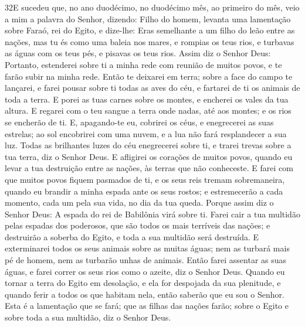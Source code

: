 \lettrine{32} E sucedeu que, no ano duodécimo, no duodécimo
mês, ao primeiro do mês, veio a mim a palavra do Senhor, dizendo:
Filho do homem, levanta uma lamentação sobre Faraó, rei do
Egito, e dize-lhe: Eras semelhante a um filho do leão entre as
nações, mas tu és como uma baleia nos mares, e rompias os teus rios,
e turbavas as águas com os teus pés, e pisavas os teus rios.
Assim diz o Senhor Deus: Portanto, estenderei sobre ti a minha
rede com reunião de muitos povos, e te farão subir na minha rede.
Então te deixarei em terra; sobre a face do campo te lançarei, e
farei pousar sobre ti todas as aves do céu, e fartarei de ti os
animais de toda a terra. E porei as tuas carnes sobre os montes,
e encherei os vales da tua altura. E regarei com o teu sangue a
terra onde nadas, até aos montes; e os rios se encherão de ti.
E, apagando-te eu, cobrirei os céus, e enegrecerei as suas
estrelas; ao sol encobrirei com uma nuvem, e a lua não fará
resplandecer a sua luz. Todas as brilhantes luzes do céu
enegrecerei sobre ti, e trarei trevas sobre a tua terra, diz o
Senhor Deus. E afligirei os corações de muitos povos, quando eu
levar a tua destruição entre as nações, às terras que não
conheceste. E farei com que muitos povos fiquem pasmados de
ti, e os seus reis tremam sobremaneira, quando eu brandir a minha
espada ante os seus rostos; e estremecerão a cada momento, cada um
pela sua vida, no dia da tua queda. Porque assim diz o Senhor
Deus: A espada do rei de Babilônia virá sobre ti. Farei cair
a tua multidão pelas espadas dos poderosos, que são todos os mais
terríveis das nações; e destruirão a soberba do Egito, e toda a sua
multidão será destruída. E exterminarei todos os seus animais
sobre as muitas águas; nem as turbará mais pé de homem, nem as
turbarão unhas de animais. Então farei assentar as suas
águas, e farei correr os seus rios como o azeite, diz o Senhor Deus.
Quando eu tornar a terra do Egito em desolação, e ela for
despojada da sua plenitude, e quando ferir a todos os que habitam
nela, então saberão que eu sou o Senhor. Esta é a lamentação
que se fará; que as filhas das nações farão; sobre o Egito e sobre
toda a sua multidão, diz o Senhor Deus.

